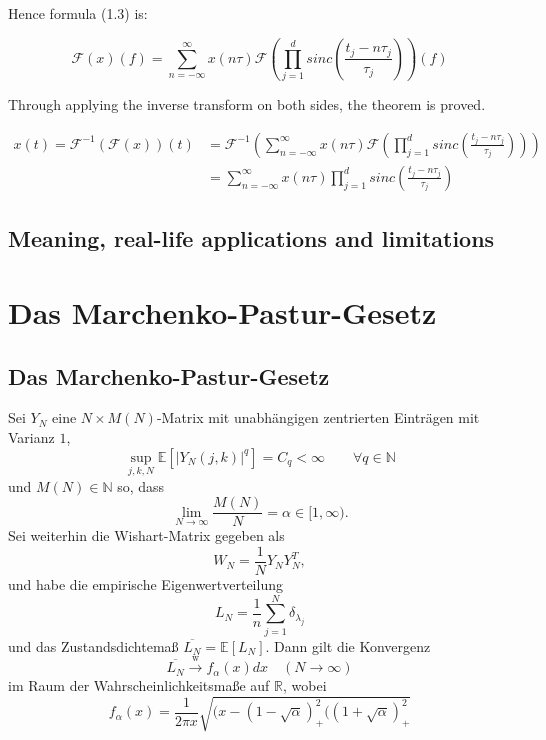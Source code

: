 \documentclass[a4paper, 11pt]{scrreprt}
\newcommand{\RR}{\mathbb{R}}
\newcommand{\EE}{\mathbb{E}}
\newcommand{\NN}{\mathbb{N}}
\newcommand{\FF}{\mathcal{F}}
\begin{document}
Hence formula (1.3) is:

\[\FF(x)(f) = \sum_{n = -\infty}^\infty x(n\tau) \FF\left(\prod_{j=1}^d sinc \left( \frac{t_j - n \tau_j}{\tau_j} \right) \right)(f)\]

Through applying the inverse transform on both sides, the theorem is proved.

\begin{align*}
x(t) = \FF^{-1}(\FF(x))(t) &= \FF^{-1} \left( \sum_{n = -\infty}^\infty x(n \tau) \FF \left( \prod_{j=1}^d sinc \left( \frac{t_j - n \tau_j}{\tau_j} \right) \right) \right) \\
&= \sum_{n = -\infty}^\infty x(n\tau) \prod_{j=1}^d sinc \left( \frac{t_j - n \tau_j}{\tau_j} \right)
\end{align*}

\section{Meaning, real-life applications and limitations}

\chapter{Das Marchenko-Pastur-Gesetz}

\section{Das Marchenko-Pastur-Gesetz}

Sei \(Y_N\) eine \(N\times M(N)\)-Matrix mit unabhängigen zentrierten Einträgen mit Varianz \(1\),
	\[\sup_{j,k,N} \EE\left[ | Y_N(j,k)|^q\right] = C_q < \infty \qquad \forall q \in \NN\]
und \(M(N) \in \NN\) so, dass
	\[\lim_{N\to\infty} \frac{M(N)}{N} = \alpha \in[1,\infty). \]
Sei weiterhin die Wishart-Matrix gegeben als 
	\[W_N = \frac{1}{N}Y_NY_N^T,\]
und habe die empirische Eigenwertverteilung
	\[L_N = \frac{1}{n} \sum_{j=1}^{N} \delta_{\lambda_j} \]
und das Zustandsdichtemaß \(\overline{L_N} = \EE[L_N]\). Dann gilt die Konvergenz
	\[\overline{L_N} \xrightarrow{\text{w}} f_{\alpha}(x)dx \quad(N\to\infty)\]
im Raum der Wahrscheinlichkeitsmaße auf \(\RR\), wobei
	\[f_{\alpha}(x)=\frac{1}{2\pi x}\sqrt{(x-(1-\sqrt{\alpha})^2_{+}((1+\sqrt{\alpha})^2_{+}} \]
\end{document}
